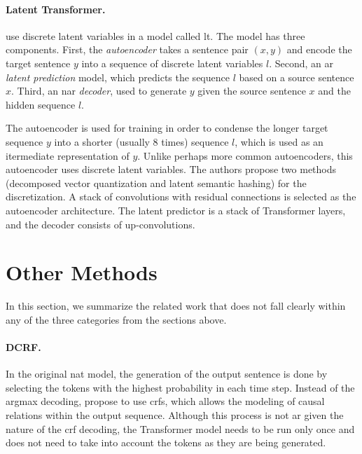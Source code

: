 \paragraph{Latent Transformer.} \citet{kaiser2018fast} use discrete latent
variables in a model called \acf{lt}. The model has three
components. First, the \emph{autoencoder} takes a sentence pair $(x, y)$ and
encode the target sentence $y$ into a sequence of discrete latent variables
$l$. Second, an \acl{ar} \emph{latent prediction} model, which predicts the
sequence $l$ based on a source sentence $x$. Third, an \acl{nar}
\emph{decoder}, used to generate $y$ given the source sentence $x$ and the
hidden sequence $l$.

The autoencoder is used for training in order to condense the longer target
sequence $y$ into a shorter (usually 8 times) sequence $l$, which is used as an
itermediate representation of $y$. Unlike perhaps more common autoencoders,
this autoencoder uses discrete latent variables. The authors propose two
methods (decomposed vector quantization and latent semantic hashing) for the
discretization. A stack of convolutions with residual connections is selected
as the autoencoder architecture. The latent predictor is a stack of Transformer
layers, and the decoder consists of up-convolutions.


\section{Other Methods}%
\label{sec:nat:misc}

In this section, we summarize the related work that does not fall clearly
within any of the three categories from the sections above.


\paragraph{DCRF.} %
In the original \ac{nat} model, the generation of the output sentence is done
by selecting the tokens with the highest probability in each time step. Instead
of the argmax decoding, \citet{sun2019fast} propose to use \acp{crf}, which
allows the modeling of causal relations within the output sequence. Although
this process is not \acl{ar} given the nature of the \ac{crf} decoding, the
Transformer model needs to be run only once and does not need to take into
account the tokens as they are being generated.

